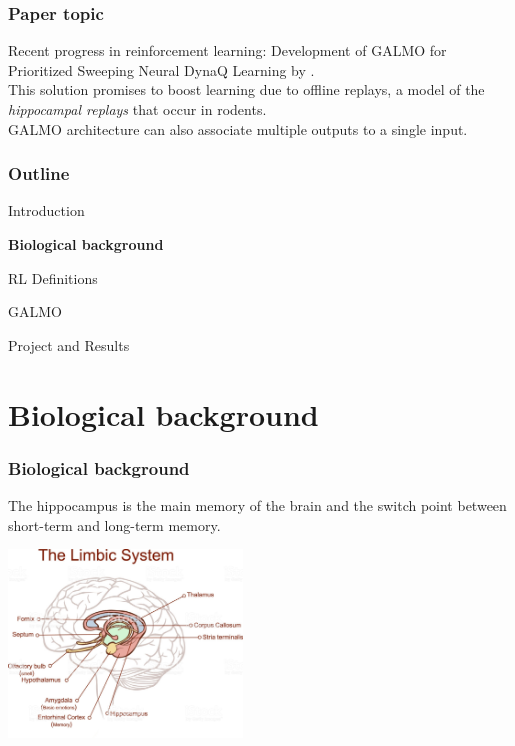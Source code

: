 \documentclass[ignorenonframetext]{beamer}
\begin{document}
\begin{frame}
\frametitle{Paper topic}
	Recent progress in reinforcement learning: Development of GALMO for Prioritized Sweeping Neural DynaQ Learning by \cite{NeuralDynaQ}.\\
	\vspace{1cm}
	This solution promises to boost learning due to offline replays, a model of the \textit{hippocampal replays} that occur in rodents.\\
	\vspace{1cm}
	GALMO architecture can also associate multiple outputs to a single input.
\end{frame}

\begin{frame}
\frametitle{Outline}
\begin{enumerate}\large{
\item Introduction \checkmark\vspace*{.4cm}
\item \textbf{Biological background}\vspace*{.4cm}
\item RL Definitions\vspace*{.4cm}
\item GALMO\vspace*{.4cm}
\item Project and Results}
\end{enumerate}
\end{frame}

\section*{Biological background}
\begin{frame}
\frametitle{Biological background}
The hippocampus is the main memory of the brain and the switch point between short-term and long-term memory.
\begin{itemize}
\end{itemize}
\begin{center}
	\hspace*{4cm}
	\includegraphics[height=5cm]{Images/hypo2}
\end{center}
\end{frame}
\end{document}
